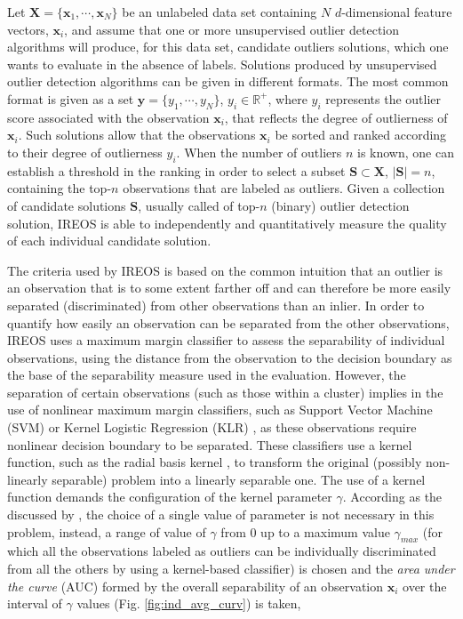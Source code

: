 Let $\mathbf{X} = \{\mathbf{x}_1, \cdots, \mathbf{x}_N \}$ be an unlabeled data set containing $N$ $d$-dimensional feature vectors, $\mathbf{x}_i$, and assume that one or more unsupervised outlier detection algorithms will produce, for this data set, candidate outliers solutions, which one wants to evaluate in the absence of labels. Solutions produced by unsupervised outlier detection algorithms can be given in different formats. The most common format is given as a set $\mathbf{y} = \{ y_1, \cdots, y_N \}$, $y_i \in \mathbb{R}^+$, where $y_i$ represents the outlier score associated with the observation $\mathbf{x}_i$, that reflects the degree of outlierness of $\mathbf{x}_i$. Such solutions allow that the observations $\mathbf{x}_i$ be sorted and ranked according to their degree of outlierness $y_i$. When the number of outliers $n$ is known, one can establish a threshold in the ranking in order to select a subset $\mathbf{S} \subset \mathbf{X}$, $|\mathbf{S}| = n$, containing the top-$n$ observations that are labeled as outliers. Given a collection of candidate solutions $\mathbf{S}$, usually called of top-$n$ (binary) outlier detection solution, IREOS \cite{marques2015} is able to independently and quantitatively measure the quality of each individual candidate solution.

The criteria used by IREOS is based on the common intuition that an outlier is an observation that is to some extent farther off and can therefore be more easily separated (discriminated) from other observations than an inlier. In order to quantify how easily an observation can be separated from the other observations, IREOS uses a maximum margin classifier \cite{bishop2006,hastie2013} to assess the separability of individual observations, using the distance from the observation to the decision boundary as the base of the separability measure used in the evaluation. However, the separation of certain observations (such as those within a cluster) implies in the use of nonlinear maximum margin classifiers, such as Support Vector Machine (SVM) or Kernel Logistic Regression (KLR) \cite{bishop2006,hastie2013}, as these observations require nonlinear decision boundary to be separated. These classifiers use a kernel function, such as the radial basis kernel \cite{scholkopf2001}, to transform the original (possibly non-linearly separable) problem into a linearly separable one. The use of a kernel function demands the configuration of the kernel parameter $\gamma$. According as the discussed by \citep{marques2015}, the choice of a single value of parameter is not necessary in this problem, instead, a range of value of $\gamma$ from 0 up to a maximum value $\gamma_{max}$ (for which all the observations labeled as outliers can be individually discriminated from all the others by using a kernel-based classifier) is chosen and the \textit{area under the curve} (AUC) formed by the overall separability of an observation $\mathbf{x}_i$ over the interval of $\gamma$ values (Fig. \ref{fig:ind_avg_curv}) is taken,

